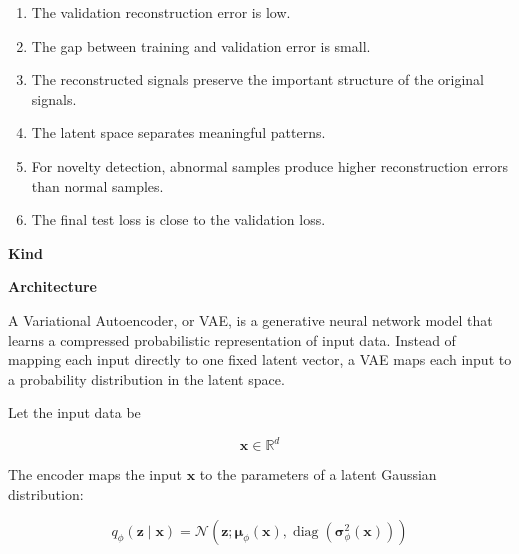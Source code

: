 \documentclass{book}
\providecommand{\ProjectDeepHeading}[2]{%
    \par\medskip\noindent\textbf{#2}\par\smallskip
}
\begin{document}
        \begin{enumerate}
            \item The validation reconstruction error is low.
            \item The gap between training and validation error is small.
            \item The reconstructed signals preserve the important structure of the original signals.
            \item The latent space separates meaningful patterns.
            \item For novelty detection, abnormal samples produce higher reconstruction errors than normal samples.
            \item The final test loss is close to the validation loss.
        \end{enumerate}

%	
%

\ProjectDeepHeading{2}{Kind}


\cite{kingma-2013-auto-encoding-variational-bayes}
    
    
    \ProjectDeepHeading{5}{Architecture}
        A Variational Autoencoder, or VAE, is a generative neural network model that learns a compressed probabilistic representation of input data. Instead of mapping each input directly to one fixed latent vector, a VAE maps each input to a probability distribution in the latent space.
        
        Let the input data be
        
        \begin{equation}
            \mathbf{x} \in \mathbb{R}^{d}
        \end{equation}
        
        The encoder maps the input $\mathbf{x}$ to the parameters of a latent Gaussian distribution:
        
        \begin{equation}
            q_{\ensuremath{\phi}}(\mathbf{z} \mid \mathbf{x})
            =
            \mathcal{N}
            \left(
                \mathbf{z};
                \boldsymbol{\ensuremath{\mu}}_{\ensuremath{\phi}}(\mathbf{x}),
                \operatorname{diag}
                \left(
                    \boldsymbol{\ensuremath{\sigma}}_{\ensuremath{\phi}}^{2}(\mathbf{x})
                \right)
            \right)
        \end{equation}
        
\end{document}
